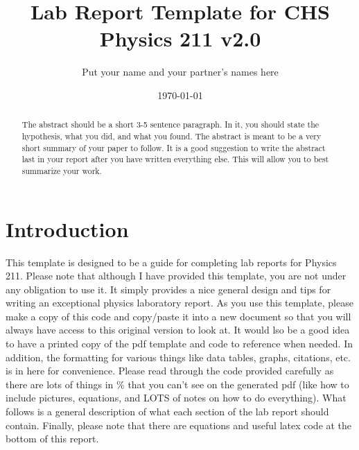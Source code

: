 \documentclass[12pt]{article}
\begin{document}
\title{Lab Report Template for CHS Physics 211 v2.0} %
\author{Put your name and your partner's names here} %


\date{\today}  %

\maketitle  %



\begin{abstract} 
	The abstract should be a short 3-5 sentence paragraph. In it, you should state the hypothesis, what you did, and what you found. The abstract is meant to be a very short summary of your paper to follow. It is a good suggestion to write the abstract last in your report after you have written everything else. This will allow you to best summarize your work. 
\end{abstract}

\section{Introduction}
	 
    This template is designed to be a guide for completing lab reports for Physics 211. Please note that although I have provided this template, you are not under any obligation to use it. It simply provides a nice general design and tips for writing an exceptional physics laboratory report. As you use this template, please make a copy of this code and copy/paste it into a new document so that you will always have access to this original version to look at. It would lso be a good idea to have a printed copy of the pdf template and code to reference when needed. In addition, the formatting for various things like data tables, graphs, citations, etc. is in here for convenience. Please read through the code provided carefully as there are lots of things in \% that you can't see on the generated pdf (like how to include pictures, equations, and LOTS of notes on how to do everything). What follows is a general description of what each section of the lab report should contain. Finally, please note that there are equations and useful latex code at the bottom of this report.\\
    
\end{document}

